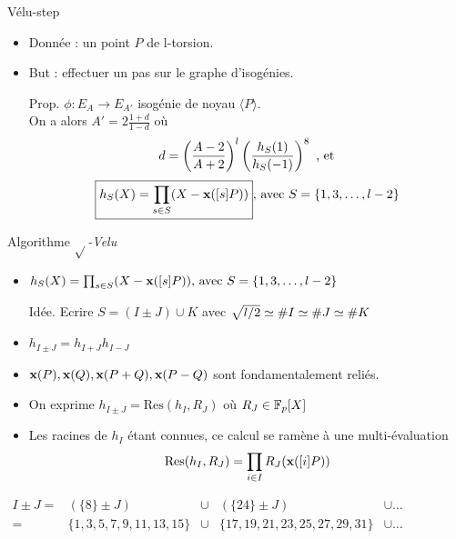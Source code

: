 \documentclass{beamer}
\begin{document}
\begin{frame}[fragile]{Vélu-step}
\begin{itemize}
	\item Donnée : un point $P$ de l-torsion.
	\item But : effectuer un pas sur le graphe d'isogénies.
	\item[Prop.]{$\phi:E_A\rightarrow E_{A'}$ isogénie de noyau $\langle P \rangle$.\\
		On a alors $\boxed{A'=2\frac{1+d}{1-d}}$ où\\
		\[d = \left(\frac{A-2}{A+2}\right)^{\mathnormal{l}} \left( \frac{h_S(1)}{h_S(-1)}\right)^8 \text{ , et}\]
			\[\boxed{h_S(X) = \prod_{s\in S}(X-\textbf{x}([s]P))}\text{, avec }S=\{1,3, \ldots, \mathnormal{l}-2\}\]}
\end{itemize}
\end{frame}

\begin{frame}[fragile]{Algorithme $\sqrt{}$\textit{-Velu}}
	\begin{itemize}
		\item{$h_S(X) = \prod_{s\in S}(X-\textbf{x}([s]P))\text{, avec }S=\{1,3, \ldots, \mathnormal{l}-2\}$}
		\item[Idée.] {Ecrire $S=(I\pm J) \cup K$} avec $\sqrt{\mathnormal{l}/2}\simeq \#I \simeq \#J \simeq \#K$
		\item{$h_{I\pm J} = h_{I+J} h_{I-J}$}
		\item{$\textbf{x}(P), \textbf{x}(Q), \textbf{x}(P+Q), \textbf{x}(P-Q)$ sont fondamentalement reliés.}
		\item{On exprime $h_{I\pm J}=\text{Res}(h_I, R_J)$ où $R_J\in\mathbb{F}_p[X]$}
		\item{Les racines de $h_I$ étant connues, ce calcul se ramène à une multi-évaluation
			\[\text{Res}(h_I, R_J)=\prod_{i\in I}R_J(\textbf{x}([i]P))\]}
	\end{itemize}$\begin{array}{rcccl}
	I\pm J =& (\{8\}\pm J) & \cup & (\{24\}\pm J) & \cup \ldots \\
	=&  {\scriptstyle \lbrace 1, 3, 5, 7, 9, 11, 13, 15\rbrace } & \cup &  {\scriptstyle \lbrace 17, 19, 21, 23, 25, 27, 29, 31\rbrace } & \cup \ldots
\end{array}$
\end{frame}
\end{document}
